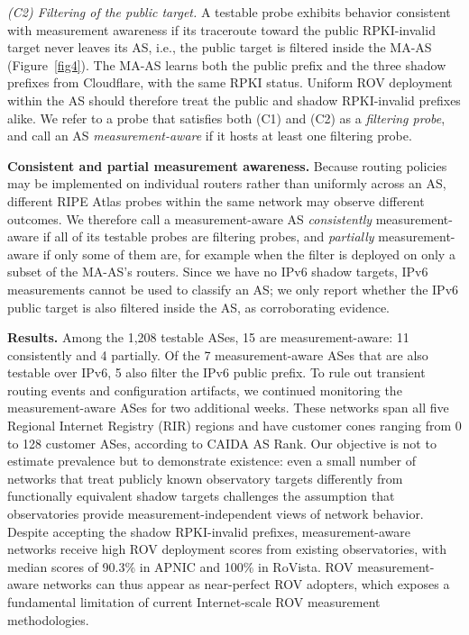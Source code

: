 \documentclass[sigconf, 10pt]{acmart}
\begin{document}
\noindent\emph{(C2) Filtering of the public target.} A testable probe exhibits behavior consistent with measurement awareness if its traceroute toward the public RPKI-invalid target never leaves its AS, i.e., the public target is filtered inside the MA-AS (Figure~\ref{fig4}). The MA-AS learns both the public prefix and the three shadow prefixes from Cloudflare, with the same RPKI status. Uniform ROV deployment within the AS should therefore treat the public and shadow RPKI-invalid prefixes alike. We refer to a probe that satisfies both (C1) and (C2) as a \emph{filtering probe}, and call an AS \emph{measurement-aware} if it hosts at least one filtering probe.

\noindent\textbf{Consistent and partial measurement awareness.} Because routing policies may be implemented on individual routers rather than uniformly across an AS, different RIPE Atlas probes within the same network may observe different outcomes. We therefore call a measurement-aware AS \emph{consistently} measurement-aware if all of its testable probes are filtering probes, and \emph{partially} measurement-aware if only some of them are, for example when the filter is deployed on only a subset of the MA-AS's routers. Since we have no IPv6 shadow targets, IPv6 measurements cannot be used to classify an AS; we only report whether the IPv6 public target is also filtered inside the AS, as corroborating evidence.

\noindent\textbf{Results.} Among the 1,208 testable ASes, 15 are measurement-aware: 11 consistently and 4 partially. Of the 7 measurement-aware ASes that are also testable over IPv6, 5 also filter the IPv6 public prefix. To rule out transient routing events and configuration artifacts, we continued monitoring the measurement-aware ASes for two additional weeks. These networks span all five Regional Internet Registry (RIR) regions and have customer cones ranging from 0 to 128 customer ASes, according to CAIDA AS Rank. Our objective is not to estimate prevalence but to demonstrate existence: even a small number of networks that treat publicly known observatory targets differently from functionally equivalent shadow targets challenges the assumption that observatories provide measurement-independent views of network behavior. Despite accepting the shadow RPKI-invalid prefixes, measurement-aware networks receive high ROV deployment scores from existing observatories, with median scores of 90.3\% in APNIC and 100\% in RoVista. ROV measurement-aware networks can thus appear as near-perfect ROV adopters, which exposes a fundamental limitation of current Internet-scale ROV measurement methodologies.
\end{document}

